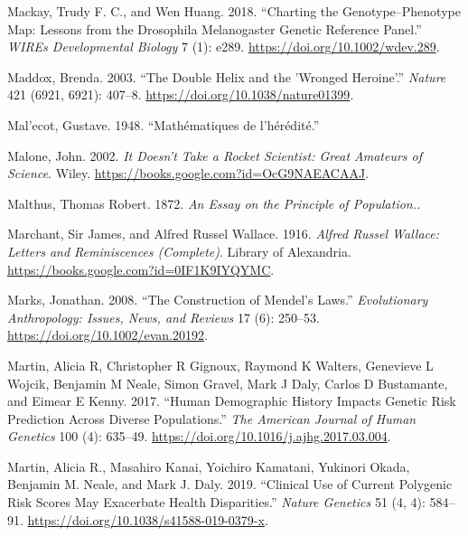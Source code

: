 \documentclass[
]{book}
\newlength{\cslhangindent}
\newlength{\cslentryspacingunit} %
\newenvironment{CSLReferences}[2] %
 {%
  \setlength{\parindent}{0pt}
  \ifodd #1
  \let\oldpar\par
  \def\par{\hangindent=\cslhangindent\oldpar}
  \fi
  \setlength{\parskip}{#2\cslentryspacingunit}
 }%
 {}
\begin{document}
\begin{CSLReferences}{1}{0}
\leavevmode{}%
Mackay, Trudy F. C., and Wen Huang. 2018. {``Charting the Genotype--Phenotype Map: Lessons from the {Drosophila} Melanogaster {Genetic Reference Panel}.''} \emph{WIREs Developmental Biology} 7 (1): e289. \url{https://doi.org/10.1002/wdev.289}.

\leavevmode{}%
Maddox, Brenda. 2003. {``The Double Helix and the 'Wronged Heroine'.''} \emph{Nature} 421 (6921, 6921): 407--8. \url{https://doi.org/10.1038/nature01399}.

\leavevmode{}%
Mal'ecot, Gustave. 1948. {``Mathématiques de l'hérédité.''}

\leavevmode{}%
Malone, John. 2002. \emph{It {Doesn}'t {Take} a {Rocket Scientist}: {Great Amateurs} of {Science}}. {Wiley}. \url{https://books.google.com?id=OcG9NAEACAAJ}.

\leavevmode{}%
Malthus, Thomas Robert. 1872. \emph{An {Essay} on the {Principle} of {Population}..}

\leavevmode{}%
Marchant, Sir James, and Alfred Russel Wallace. 1916. \emph{Alfred {Russel Wallace}: {Letters} and {Reminiscences} ({Complete})}. {Library of Alexandria}. \url{https://books.google.com?id=0IF1K9IYQYMC}.

\leavevmode{}%
Marks, Jonathan. 2008. {``The Construction of {Mendel}'s Laws.''} \emph{Evolutionary Anthropology: Issues, News, and Reviews} 17 (6): 250--53. \url{https://doi.org/10.1002/evan.20192}.

\leavevmode{}%
Martin, Alicia R, Christopher R Gignoux, Raymond K Walters, Genevieve L Wojcik, Benjamin M Neale, Simon Gravel, Mark J Daly, Carlos D Bustamante, and Eimear E Kenny. 2017. {``Human Demographic History Impacts Genetic Risk Prediction Across Diverse Populations.''} \emph{The American Journal of Human Genetics} 100 (4): 635--49. \url{https://doi.org/10.1016/j.ajhg.2017.03.004}.

\leavevmode{}%
Martin, Alicia R., Masahiro Kanai, Yoichiro Kamatani, Yukinori Okada, Benjamin M. Neale, and Mark J. Daly. 2019. {``Clinical Use of Current Polygenic Risk Scores May Exacerbate Health Disparities.''} \emph{Nature Genetics} 51 (4, 4): 584--91. \url{https://doi.org/10.1038/s41588-019-0379-x}.


\end{CSLReferences}
\end{document}
